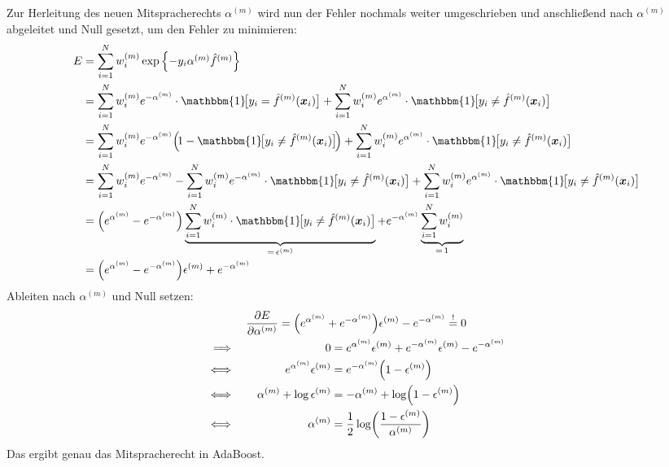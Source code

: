 				Zur Herleitung des neuen Mitspracherechts \( \alpha^{(m)} \) wird nun der Fehler nochmals weiter umgeschrieben und anschließend nach \(\alpha^{(m)}\) abgeleitet und Null gesetzt, um den Fehler zu minimieren:
				\begin{align}
					E
						&= \sum_{i = 1}^{N} w_i^{(m)} \exp\Big\{ { \textstyle  -y_i \alpha^{(m)} \hat{f}^{(m)} } \Big\} \\
						&= \sum_{i = 1}^{N} w_i^{(m)} e^{-\alpha^{(m)}} \cdot \mathbbm{1}\!\big[ y_i = \hat{f}^{(m)}(\vec{x}_i) \big] + \sum_{i = 1}^{N} w_i^{(m)} e^{\alpha^{(m)}} \cdot \mathbbm{1}\!\big[ y_i \neq \hat{f}^{(m)}(\vec{x}_i) \big] \\
						&= \sum_{i = 1}^{N} w_i^{(m)} e^{-\alpha^{(m)}} \Big(\! 1 - \mathbbm{1}\!\big[ y_i \neq \hat{f}^{(m)}(\vec{x}_i) \big] \!\Big) + \sum_{i = 1}^{N} w_i^{(m)} e^{\alpha^{(m)}} \cdot \mathbbm{1}\!\big[ y_i \neq \hat{f}^{(m)}(\vec{x}_i) \big] \\
						&= \sum_{i = 1}^{N} w_i^{(m)} e^{-\alpha^{(m)}} - \sum_{i = 1}^{N} w_i^{(m)} e^{-\alpha^{(m)}} \cdot \mathbbm{1}\!\big[ y_i \neq \hat{f}^{(m)}(\vec{x}_i) \big] + \sum_{i = 1}^{N} w_i^{(m)} e^{\alpha^{(m)}} \cdot \mathbbm{1}\!\big[ y_i \neq \hat{f}^{(m)}(\vec{x}_i) \big] \\
						&= \Big( e^{\alpha^{(m)}} - e^{-\alpha^{(m)}} \Big) \underbrace{\sum_{i = 1}^{N} w_i^{(m)} \cdot \mathbbm{1}\!\big[ y_i \neq \hat{f}^{(m)}(\vec{x}_i) \big]}_{=\, \epsilon^{(m)}} + e^{-\alpha^{(m)}} \underbrace{\sum_{i = 1}^{N} w_i^{(m)}}_{=\, 1} \\
						&= \Big( e^{\alpha^{(m)}} - e^{-\alpha^{(m)}} \Big) \epsilon^{(m)} + e^{-\alpha^{(m)}} \\
				\end{align}
				Ableiten nach \( \alpha^{(m)} \) und Null setzen:
				\begin{gather}
					\pdv{E}{\alpha^{(m)}} = \Big( e^{\alpha^{(m)}} + e^{-\alpha^{(m)}} \Big) \epsilon^{(m)} - e^{-\alpha^{(m)}} \overset{!}{=} 0 \\
					\begin{aligned}[t]
						\implies\quad&&
						0 &= e^{\alpha^{(m)}} \epsilon^{(m)} + e^{-\alpha^{(m)}} \epsilon^{(m)} - e^{-\alpha^{(m)}} \\
						\iff\quad&&
						e^{\alpha^{(m)}} \epsilon^{(m)} &= e^{-\alpha^{(m)}} \Big( 1 - \epsilon^{(m)} \Big) \\
						\iff\quad&&
						\alpha^{(m)} + \log \epsilon^{(m)} &= -\alpha^{(m)} + \log( 1 - \epsilon^{(m)} ) \\
						\iff\quad&&
						\alpha^{(m)} &= \frac{1}{2} \log( \frac{1 - \epsilon^{(m)}}{\alpha^{(m)}} )
					\end{aligned}
				\end{gather}
				Das ergibt genau das Mitspracherecht in AdaBoost.

